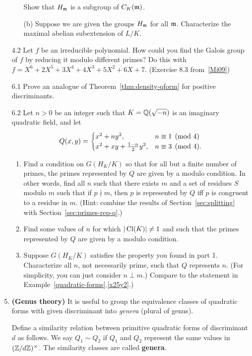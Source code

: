 \begin{enumerate}
\begin{enumerate}
\[\]
Show that $H_{\mathfrak{m}}$ is a subgroup of $C_K({\mathfrak{m}})$.
\item[(b)]
Suppose we are given the groups $H_{\mathfrak{m}}$ for all $\mathfrak{m}$. Characterize the maximal abelian subextension of $L/K$.
\end{enumerate}
\item[4.2] Let $f$ be an irreducible polynomial. How could you find the Galois group of $f$ by reducing it modulo different primes? Do this with $f=X^6+2X^5+3X^4+4X^3+5X^2+6X+7$. (Exercise 8.3 from~\ref{Mi09})
\item[6.1] Prove an analogue of Theorem~\ref{thm:density-qform} for positive discriminants.
\item[6.2] Let $n>0$ be an integer such that $K=\mathbb{Q}(\sqrt{-n})$ is an imaginary quadratic field, and let 
\[
Q(x,y)=\begin{cases}
x^2+ny^2,&n\equiv 1\pmod 4\\
x^2+xy+\frac{1-n}{2}y^2,&n\equiv 3 \pmod 4. 
\end{cases}
\]
\begin{enumerate}
\item
Find a condition on $G(H_K/K)$ so that for all but a finite number of primes, the primes represented by $Q$ are given by a modulo condition. In other words, find all $n$ such that there exists $m$ and a set of residues $S$ modulo $m$ such that if $p\nmid m$, then $p$ is represented by $Q$ iff $p$ is congruent to a residue in $m$. (Hint: combine the results of Section~\ref{sec:splitting} with Section~\ref{sec:primes-rep-q}.)
\item
Find some values of $n$ for which $|\operatorname{Cl}(K)|\ne 1$ and such that the primes represented by $Q$ are given by a modulo condition.
\item
Suppose $G(H_K/K)$ satisfies the property you found in part 1. Characterize all $n$, not necessarily prime, such that $Q$ represents $n$. (For simplicity, you can just consider $n\perp m$.) Compare to the statement in Example~\ref{quadratic-forms}.\ref{x25y2}.)
\end{enumerate}
\item \textbf{(Genus theory)} It is useful to group the equivalence classes of quadratic forms with given discriminant into {\it genera} (plural of genus).

\begin{df}
Define a similarity relation between primitive quadratic forms of discriminant $d$ as follows. We say $Q_1\sim Q_2$ if $Q_1$ and $Q_2$ represent the same values in $(\mathbb{Z}/d\mathbb{Z})^{\times}$. The similarity classes are called \textbf{genera}.
\end{df}


\end{enumerate}
